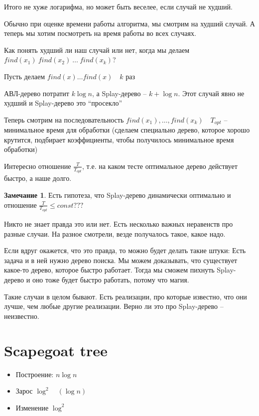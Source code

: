 \documentclass{book}
\theoremstyle{definition}
\newtheorem*{note}{Замечание}
\begin{document}
Итого не хуже логарифма, но может быть веселее, если случай не худший.

Обычно при оценке времени работы алгоритма, мы смотрим на худший случай. А теперь мы хотим посмотреть на время работы во всех случаях.

Как понять худший ли наш случай или нет, когда мы делаем $find(x_1)\ find(x_2)\ \ldots \ find(x_{k} )$?

Пусть делаем $find(x) \ldots find(x)\quad k$ раз

АВЛ-дерево потратит $k\log n$, а Splay-дерево -- $k + \log n$. Этот случай явно не худший и Splay-дерево это ``просекло''

Теперь смотрим на последовательность $find(x_1), \ldots, find(x_k)\quad T_{opt}$ -- минимальное время для обработки (сделаем специально дерево, которое хорошо крутится, подбирает коэффициенты, чтобы получилось минимальное время обработки)

Интересно отношение $\frac{T}{T_{opt}}$, т.е. на каком тесте оптимальное дерево действует быстро, а наше долго.

\begin{note}
    Есть гипотеза, что Splay-дерево динамически оптимально и отношение $\frac{T}{T_{opt}} \leqslant const???$ 

    Никто не знает правда это или нет. Есть несколько важных неравенств про разные случаи. На разное смотрели, везде получалось такое, какое надо.

    Если вдруг окажется, что это правда, то можно будет делать такие штуки:
    Есть задача и в ней нужно дерево поиска. Мы можем доказывать, что существует какое-то дерево, которое быстро работает. Тогда мы сможем пихнуть Splay-дерево и оно тоже будет быстро работать, потому что магия.

    Такие случаи в целом бывают. Есть реализации, про которые известно, что они лучше, чем любые другие реализации. Верно ли это про Splay-дерево -- неизвестно.
\end{note}


\section{Scapegoat tree}

\begin{itemize}
    \item Построение: $n\log n$
    \item Зарос $\log ^2\quad \left( \log  n \right) $
    \item Изменение $\log ^2$
\end{itemize}
\end{document}
